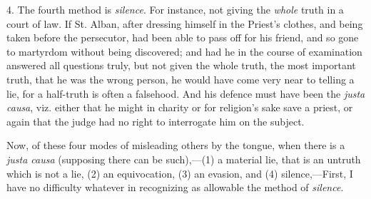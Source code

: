 4. The fourth method is \emph{silence}. For instance, not giving the \emph{whole}
truth in a court of law. If St. Alban, after dressing himself in the
Priest's clothes, and being taken before the persecutor, had been able
to pass off for his friend, and so gone to martyrdom without being
discovered; and had he in the course of examination answered all
questions truly, but not given the whole truth, the most important
truth, that he was the wrong person, he would have come very near to
telling a lie, for a half-truth is often a falsehood. And his
defence must have been the \emph{justa causa}, viz. either that he might
in charity or for religion's sake save a priest, or again that the judge
had no right to interrogate him on the subject.

Now, of these four modes of misleading others by the tongue, when
there is a \emph{justa causa} (supposing there can be such),—(1)
a material lie, that is an untruth which is not a lie, (2) an
equivocation, (3) an evasion, and (4) silence,—First, I
have no difficulty whatever in recognizing as allowable the method of \emph{silence}.

